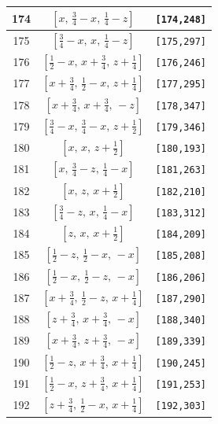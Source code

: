 \documentclass[fleqn,8pt]{jsarticle}
\begin{document}
\begin{longtable}{ccc}
174 & $\left[ x,\, \frac{3}{4} - x,\, \frac{1}{4} - z \right]$ & {\tt [174,248]} \\ \hline
175 & $\left[ \frac{3}{4} - x,\, x,\, \frac{1}{4} - z \right]$ & {\tt [175,297]} \\ \hline
176 & $\left[ \frac{1}{2} - x,\, x + \frac{3}{4},\, z + \frac{1}{4} \right]$ & {\tt [176,246]} \\ \hline
177 & $\left[ x + \frac{3}{4},\, \frac{1}{2} - x,\, z + \frac{1}{4} \right]$ & {\tt [177,295]} \\ \hline
178 & $\left[ x + \frac{3}{4},\, x + \frac{3}{4},\, - z \right]$ & {\tt [178,347]} \\ \hline
179 & $\left[ \frac{3}{4} - x,\, \frac{3}{4} - x,\, z + \frac{1}{2} \right]$ & {\tt [179,346]} \\ \hline
180 & $\left[ x,\, x,\, z + \frac{1}{2} \right]$ & {\tt [180,193]} \\ \hline
181 & $\left[ x,\, \frac{3}{4} - z,\, \frac{1}{4} - x \right]$ & {\tt [181,263]} \\ \hline
182 & $\left[ x,\, z,\, x + \frac{1}{2} \right]$ & {\tt [182,210]} \\ \hline
183 & $\left[ \frac{3}{4} - z,\, x,\, \frac{1}{4} - x \right]$ & {\tt [183,312]} \\ \hline
184 & $\left[ z,\, x,\, x + \frac{1}{2} \right]$ & {\tt [184,209]} \\ \hline
185 & $\left[ \frac{1}{2} - z,\, \frac{1}{2} - x,\, - x \right]$ & {\tt [185,208]} \\ \hline
186 & $\left[ \frac{1}{2} - x,\, \frac{1}{2} - z,\, - x \right]$ & {\tt [186,206]} \\ \hline
187 & $\left[ x + \frac{3}{4},\, \frac{1}{2} - z,\, x + \frac{1}{4} \right]$ & {\tt [187,290]} \\ \hline
188 & $\left[ z + \frac{3}{4},\, x + \frac{3}{4},\, - x \right]$ & {\tt [188,340]} \\ \hline
189 & $\left[ x + \frac{3}{4},\, z + \frac{3}{4},\, - x \right]$ & {\tt [189,339]} \\ \hline
190 & $\left[ \frac{1}{2} - z,\, x + \frac{3}{4},\, x + \frac{1}{4} \right]$ & {\tt [190,245]} \\ \hline
191 & $\left[ \frac{1}{2} - x,\, z + \frac{3}{4},\, x + \frac{1}{4} \right]$ & {\tt [191,253]} \\ \hline
192 & $\left[ z + \frac{3}{4},\, \frac{1}{2} - x,\, x + \frac{1}{4} \right]$ & {\tt [192,303]} \\
\end{longtable}
\end{document}
